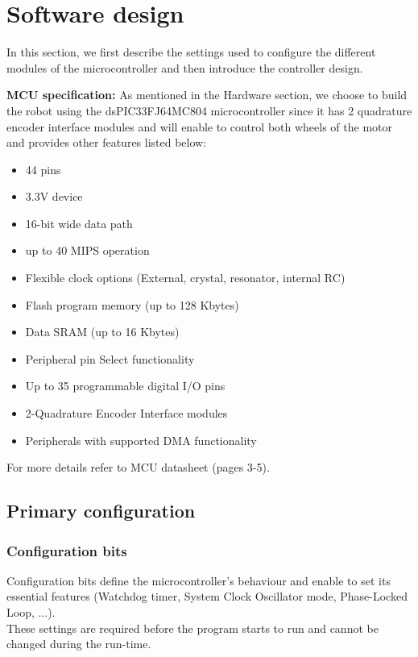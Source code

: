 \section{Software design} \label{chap:software}
In this section, we first describe the settings used to configure the different modules of the microcontroller and then introduce the controller design.

\vskip 0.2in
\noindent
\textbf{MCU specification:}
\vskip 0.1in
\noindent
As mentioned in the Hardware section, we choose to build the robot using the dsPIC33FJ64MC804 microcontroller since it has 2 quadrature encoder interface modules and will enable to control both wheels of the motor and provides other features listed below:
\begin{itemize}
    \item 44 pins
    \item 3.3V device
    \item 16-bit wide data path
    \item up to 40 MIPS operation
    \item Flexible clock options (External, crystal, resonator, internal RC)
    \item Flash program memory (up to 128 Kbytes)
    \item Data SRAM (up to 16 Kbytes)
    \item Peripheral pin Select functionality
    \item Up to 35 programmable digital I/O pins
    \item 2-Quadrature Encoder Interface modules
    \item Peripherals with supported DMA functionality
\end{itemize}
For more details refer to MCU datasheet \cite{mcu}(pages 3-5).

\subsection{Primary configuration}

\subsubsection*{Configuration bits}

Configuration bits define the microcontroller’s behaviour and enable to set its essential features (Watchdog timer, System Clock Oscillator mode, Phase-Locked Loop, ...).\\
These settings are required before the program starts to run and cannot be changed during the run-time.\\
\vskip 0.1in
\noindent

